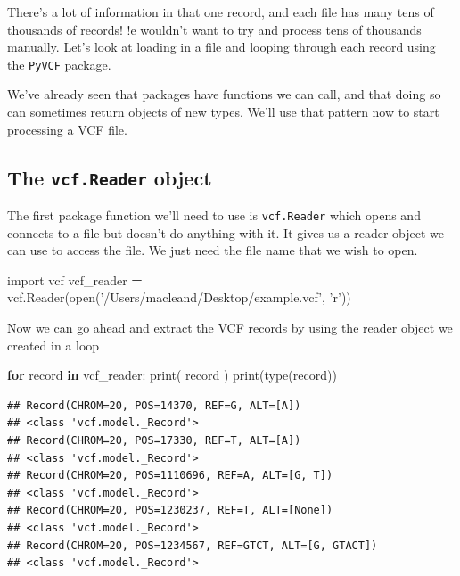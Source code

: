 \documentclass[]{book}
\newenvironment{Shaded}{\begin{snugshade}}{\end{snugshade}}
\newcommand{\BuiltInTok}[1]{#1}
\newcommand{\ControlFlowTok}[1]{\textcolor[rgb]{0.13,0.29,0.53}{\textbf{#1}}}
\newcommand{\ImportTok}[1]{#1}
\newcommand{\KeywordTok}[1]{\textcolor[rgb]{0.13,0.29,0.53}{\textbf{#1}}}
\newcommand{\NormalTok}[1]{#1}
\newcommand{\OperatorTok}[1]{\textcolor[rgb]{0.81,0.36,0.00}{\textbf{#1}}}
\newcommand{\StringTok}[1]{\textcolor[rgb]{0.31,0.60,0.02}{#1}}
\theoremstyle{definition}
\theoremstyle{definition}
\theoremstyle{definition}
\theoremstyle{remark}
\begin{document}
There's a lot of information in that one record, and each file has many
tens of thousands of records! !e wouldn't want to try and process tens
of thousands manually. Let's look at loading in a file and looping
through each record using the \texttt{PyVCF} package.

We've already seen that packages have functions we can call, and that
doing so can sometimes return objects of new types. We'll use that
pattern now to start processing a VCF file.

\hypertarget{the-vcf.reader-object}{%
\subsection{\texorpdfstring{The \texttt{vcf.Reader}
object}{The vcf.Reader object}}\label{the-vcf.reader-object}}

The first package function we'll need to use is \texttt{vcf.Reader}
which opens and connects to a file but doesn't do anything with it. It
gives us a reader object we can use to access the file. We just need the
file name that we wish to open.

\begin{Shaded}
\begin{Highlighting}[]
\ImportTok{import}\NormalTok{ vcf}
\NormalTok{vcf_reader }\OperatorTok{=}\NormalTok{ vcf.Reader(}\BuiltInTok{open}\NormalTok{(}\StringTok{'/Users/macleand/Desktop/example.vcf'}\NormalTok{, }\StringTok{'r'}\NormalTok{))}
\end{Highlighting}
\end{Shaded}

Now we can go ahead and extract the VCF records by using the reader
object we created in a loop

\begin{Shaded}
\begin{Highlighting}[]
\ControlFlowTok{for}\NormalTok{ record }\KeywordTok{in}\NormalTok{ vcf_reader:}
  \BuiltInTok{print}\NormalTok{( record )}
  \BuiltInTok{print}\NormalTok{(}\BuiltInTok{type}\NormalTok{(record))}
\end{Highlighting}
\end{Shaded}

\begin{verbatim}
## Record(CHROM=20, POS=14370, REF=G, ALT=[A])
## <class 'vcf.model._Record'>
## Record(CHROM=20, POS=17330, REF=T, ALT=[A])
## <class 'vcf.model._Record'>
## Record(CHROM=20, POS=1110696, REF=A, ALT=[G, T])
## <class 'vcf.model._Record'>
## Record(CHROM=20, POS=1230237, REF=T, ALT=[None])
## <class 'vcf.model._Record'>
## Record(CHROM=20, POS=1234567, REF=GTCT, ALT=[G, GTACT])
## <class 'vcf.model._Record'>
\end{verbatim}
\end{document}
